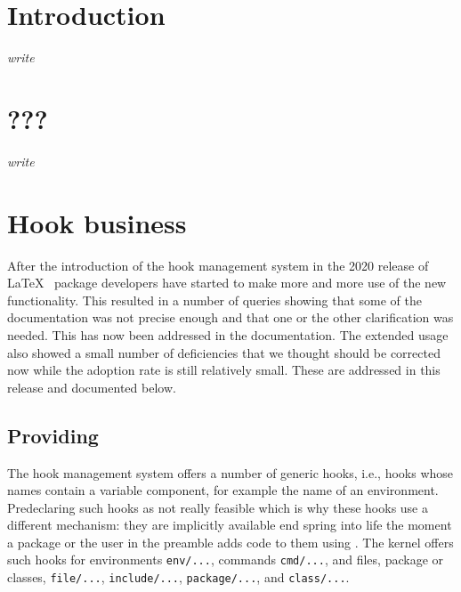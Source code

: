 \documentclass{ltnews}
\providecommand\tubcommand[1]{}
\begin{document}
\tubcommand{\addtolength\textheight{4.2pc}}   %

\maketitle
{ \spaceskip=3.33pt  \tableofcontents}

\setlength{}


\medskip


\section{Introduction}

\emph{write}

\section{???}

\emph{write}




\section{Hook business}

After the introduction of the hook management system in the 2020
release of \LaTeX{}~\cite{34:ltnews32} package developers have started
to make more and more use of the new functionality. This resulted in a
number of queries showing that some of the documentation was not
precise enough and that one or the other clarification was
needed. This has now been addressed in the documentation. The extended
usage also showed a small number of deficiencies that we thought
should be corrected now while the adoption rate is still relatively
small. These are addressed in this release and documented below.


\subsection{Providing }

The hook management system offers a number of generic hooks, i.e.,
hooks whose names contain a variable component, for example the name
of an environment. Predeclaring such hooks as not really feasible
which is why these hooks use a different mechanism: they are
implicitly available end spring into life the moment a package or the
user in the preamble adds code to them using .  The
kernel offers such hooks for environments \texttt{env/...}, commands
\texttt{cmd/...}, and files, package or classes, \texttt{file/...},
\texttt{include/...}, \texttt{package/...}, and \texttt{class/...}.
\end{document}
